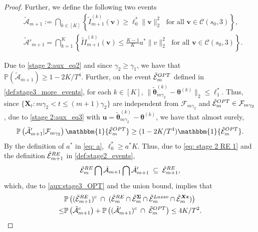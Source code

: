 \documentclass[10pt,a4paper]{amsart}
\newcommand{\Pro}{\mathbb{P}}
\newcommand{\bSigma}{\boldsymbol{\Sigma}}
\newcommand{\bX}{\boldsymbol{X}}
\newcommand{\bd}[1]{\boldsymbol{#1}}
\newcommand{\bepsilon}{\bd{\epsilon}}
\newcommand{\btheta}{\boldsymbol{\theta}}
\newcommand{\bu}{\boldsymbol{u}}
\newcommand{\bv}{\boldsymbol{v}}
\newcommand{\cF}{\mathcal{F}}
\newcommand{\idf}{\mathbbm{1}}
\newcommand{\mE}{\mathcal{E}}
\newcommand{\tbtheta}{\widetilde{\boldsymbol{\theta}}}
\begin{document}
\begin{proof}
Further, we define the following two events
\begin{align*}
 &\widetilde{\mathcal{A}}_{m+1} := \bigcap_{k \in [K]} \left\{ \widetilde{I}_{m+1}^{(k)}(\bv) \geq \ell_0^* \|\bv\|_2^2 \; \text{ for all } 
\bv\in \mathcal{C}(s_0,3)\right\},\\
& \widetilde{\mathcal{A}}'_{m+1}=\bigcap_{k = 1}^{K}\left\{ \widetilde{II}_{m+1}^{(k)}(\bv) \leq  \frac{K-1}{K} a^*\|v\|_2^2\; \text{ for all } 
\bv\in \mathcal{C}(s_0,3)
\right\}.
\end{align*}

Due to \eqref{stage 2:aux_eq2} and since $\gamma_2 \geq \gamma_1$, we have that $\Pro\left(\tilde{\mathcal{A}}_{m+1}\right) \geq 1 -2K/T^4$. Further, on the event $\tilde{\mE}_{m}^{\textup{OPT}}$ defined in \eqref{def:stage3_more_events}, for each $k \in [K]$, $\|\tbtheta_{m\gamma_2}^{(k)}-\btheta^{(k)}\|_2 \leq  \ell_1^*$. Thus, since $\{\bX_t: m\gamma_2 < t \leq (m+1)\gamma_2\}$ are independent from $\cF_{m\gamma_2}$ and $\tilde{\mE}_m^{\textup{OPT}} \in \cF_{m\gamma_2}$, due to \eqref{stage 2:aux_eq3} with $\bu =\tbtheta_{m\gamma_2}^{(k)}-\btheta^{(k)}$, we have that almost surely,
\begin{align*}
    \Pro\left(\tilde{\mathcal{A}}'_{m+1} \vert \cF_{m\gamma_2} \right) \idf\{\tilde{\mE}_{m}^{\textup{OPT}}\}  \geq (1 - 2K/T^4)\idf\{\tilde{\mE}_{m}^{\textup{OPT}}\}.
\end{align*}
By the definition of $a^*$ in \eqref{eq: a}, $\ell_0^* \geq a^* K$. Thus, due to \eqref{eq: stage 2 RE 1} and the definition $\tilde{\mE}_{m+1}^{\textup{RE}}$ in \eqref{def:stage2_events},
\begin{equation}
    \label{aux:stage3_RE}
\tilde{\mE}_{m}^{\textup{RE}} \bigcap
\tilde{\mathcal{A}}_{m+1} \bigcap \tilde{\mathcal{A}}'_{m+1}
\;\subseteq\; \tilde{\mE}_{m+1}^{\textup{RE}},
\end{equation}
which, due to \eqref{aux:stage3_OPT} and the union bound, implies that
\begin{align}
        \label{aux:stage3_step3}
        \begin{split}
            &\Pro\left(( \tilde{\mE}_{m+1}^{\textup{RE}})^c\; \cap \; (\tilde{\mE}_{m}^{\textup{RE}} \cap 
            \tilde{\mE}_{m}^{\bSigma} \cap
            \tilde{\mE}_{m}^{\textup{Lasso}} \cap    \tilde{\mE}_{m}^{\bX\bepsilon})\right) \\
\leq & \Pro\left(\tilde{\mathcal{A}}_{m+1}^c\right) + \Pro\left((\tilde{\mathcal{A}}'_{m+1})^c\; \cap \;{\tilde{\mE}_{m}^{\textup{OPT}}} \right) \leq 4K/T^2.
        \end{split}
\end{align}


\end{proof}
\end{document}
